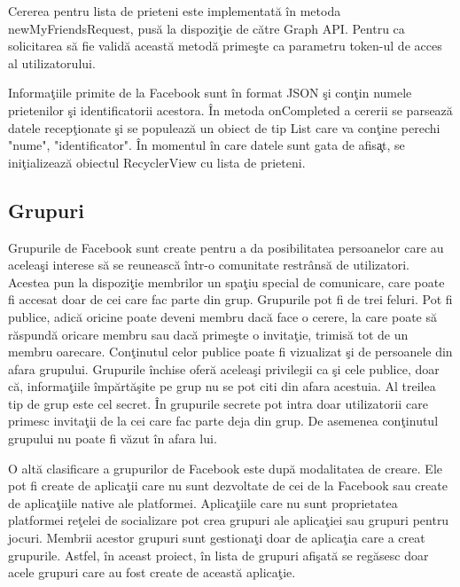 Cererea pentru lista de prieteni este implementat\u{a} \^{i}n metoda newMyFriendsRequest, pus\u{a} la dispozi\c{t}ie de c\u{a}tre Graph API. Pentru ca solicitarea s\u{a} fie valid\u{a} aceast\u{a} metod\u{a} prime\c{s}te ca parametru token-ul de acces al utilizatorului.

Informa\c{t}iile primite de la Facebook sunt \^{i}n format JSON \c{s}i con\c{t}in numele prietenilor \c{s}i identificatorii acestora. \^{I}n metoda onCompleted a cererii se parseaz\u{a} datele recep\c{t}ionate \c{s}i se populeaz\u{a} un obiect de tip List care va con\c{t}ine perechi "nume", "identificator". \^{I}n momentul \^{i}n care datele sunt gata de afis\c{a}t, se ini\c{t}ializeaz\u{a} obiectul RecyclerView cu lista de prieteni. 

\subsection{Grupuri}

Grupurile de Facebook sunt create pentru a da posibilitatea persoanelor care au acelea\c{s}i interese s\u{a} se reuneasc\u{a} \^{i}ntr-o comunitate restr\^{a}ns\u{a} de utilizatori. Acestea pun la dispozi\c{t}ie membrilor un spa\c{t}iu special de comunicare, care poate fi accesat doar de cei care fac parte din grup. Grupurile pot fi de trei feluri. Pot fi publice, adic\u{a} oricine poate deveni membru dac\u{a} face o cerere, la care poate s\u{a} r\u{a}spund\u{a} oricare membru sau dac\u{a} prime\c{s}te o invita\c{t}ie, trimis\u{a} tot de un membru oarecare. Con\c{t}inutul celor publice poate fi vizualizat \c{s}i de persoanele din afara grupului. Grupurile \^{i}nchise ofer\u{a} acelea\c{s}i privilegii ca \c{s}i cele publice, doar c\u{a}, informa\c{t}iile \^{i}mp\u{a}rt\u{a}\c{s}ite pe grup nu se pot citi din afara acestuia. Al treilea tip de grup este cel secret. \^{I}n grupurile secrete pot intra doar utilizatorii care primesc invita\c{t}ii de la cei care fac parte deja din grup. De asemenea con\c{t}inutul grupului nu poate fi v\u{a}zut \^{i}n afara lui. 

O alt\u{a} clasificare a grupurilor de Facebook este dup\u{a} modalitatea de creare. Ele pot fi create de aplica\c{t}ii care nu sunt dezvoltate de cei de la Facebook sau create de aplica\c{t}iile native ale platformei. Aplica\c{t}iile care nu sunt proprietatea platformei re\c{t}elei de socializare pot crea grupuri ale aplica\c{t}iei sau grupuri pentru jocuri. Membrii acestor grupuri sunt gestiona\c{t}i doar de aplica\c{t}ia care a creat grupurile. Astfel, \^{i}n aceast proiect, \^{i}n lista de grupuri afi\c{s}at\u{a} se reg\u{a}sesc doar acele grupuri care au fost create de aceast\u{a} aplica\c{t}ie. 

